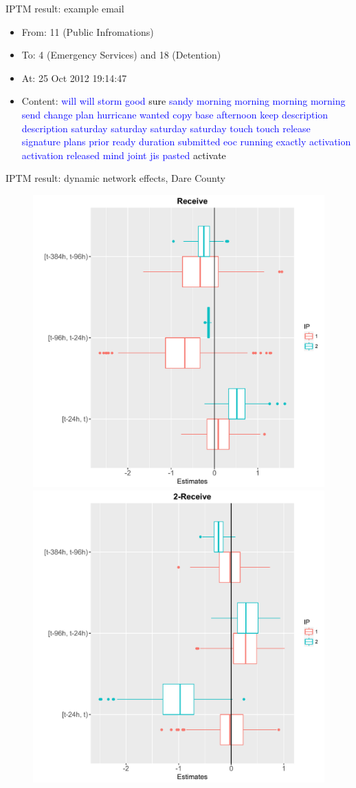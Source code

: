 \documentclass[10pt, xcolor=table]{beamer}
\theoremstyle{definition}
\theoremstyle{remark}
\newenvironment{changemargin}[2]{%
  \begin{list}{}{%
    \setlength{\topsep}{0pt}%
    \setlength{\leftmargin}{#1}%
    \setlength{\rightmargin}{#2}%
    \setlength{\listparindent}{\parindent}%
    \setlength{\itemindent}{\parindent}%
    \setlength{\parsep}{\parskip}%
  }%
  \item[]}{\end{list}}
\begin{document}
\begin{frame}{IPTM result: example email}
\begin{itemize}
	\item From: 11 (Public Infromations)\\
	\item To: 4 (Emergency Services) and 18 (Detention)\\	 
	\item At: 25 Oct 2012 19:14:47\\
	\item Content:
\textcolor{blue}{ will will storm good \textcolor{black}{sure} sandy morning morning morning morning send change plan hurricane wanted copy base afternoon keep description description saturday saturday saturday saturday touch touch release signature plans prior ready duration submitted eoc running exactly activation activation released mind joint jis pasted \textcolor{black}{activate}}
	\end{itemize}
\end{frame}


\begin{frame}{IPTM result: dynamic network effects, Dare County}
\begin{changemargin}{-1cm}{-1cm}
	\begin{figure}
		\includegraphics[width=.55\textwidth]{figures/receive.pdf} \includegraphics[width=.55\textwidth]{figures/2receive.pdf}
			\end{figure}
	\end{changemargin}
\end{frame}
\end{document}

